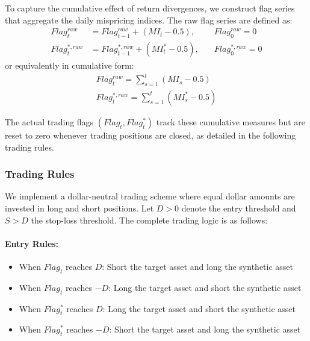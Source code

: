 To capture the cumulative effect of return divergences, we construct flag series that aggregate the daily mispricing indices. The raw flag series are defined as:
%
\begin{equation*}
\begin{array}{lll}
Flag_t^{raw} &= Flag_{t-1}^{raw} + (MI_t - 0.5), &\quad Flag_0^{raw} = 0
\\[0.5em]
Flag_t^{*,raw} &= Flag_{t-1}^{*,raw} + (MI_t^* - 0.5), &\quad Flag_0^{*,raw} = 0
\end{array}
\end{equation*}
%
or equivalently in cumulative form:
%
\begin{equation*}
\begin{array}{ll}
Flag_t^{raw} = \sum_{s=1}^t (MI_s - 0.5)
\\[0.5em]
Flag_t^{*,raw} = \sum_{s=1}^t (MI_s^* - 0.5)
\end{array}
\end{equation*}

The actual trading flags $(Flag_t, Flag_t^*)$ track these cumulative measures but are reset to zero whenever trading positions are closed, as detailed in the following trading rules.

\subsubsection{Trading Rules}

We implement a dollar-neutral trading scheme where equal dollar amounts are invested in long and short positions. Let $D > 0$ denote the entry threshold and $S > D$ the stop-loss threshold. The complete trading logic is as follows:

\paragraph{Entry Rules:}
\begin{itemize}
\item When $Flag_t$ reaches $D$: Short the target asset and long the synthetic asset
\item When $Flag_t$ reaches $-D$: Long the target asset and short the synthetic asset
\item When $Flag_t^*$ reaches $D$: Long the target asset and short the synthetic asset  
\item When $Flag_t^*$ reaches $-D$: Short the target asset and long the synthetic asset
\end{itemize}

